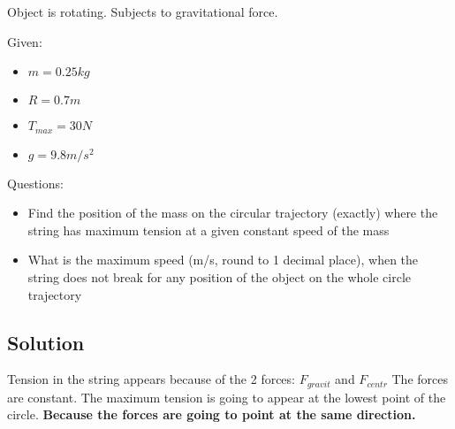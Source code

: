 
Object is rotating. Subjects to gravitational force.


\bigbreak Given: 
\begin{itemize}
    \item $  m  = 0.25kg $
    \item $ R = 0.7m $
    \item $ T_{max} = 30N $
    \item $ g = 9.8m/s^2 $
\end{itemize}


\bigbreak Questions:
\begin{itemize}
    \item Find the position of the mass on the circular trajectory (exactly) where the string has
    maximum tension at a given constant speed of the mass
    \item What is the maximum speed (m/s, round to 1 decimal place), when the string does not
    break for any position of the object on the whole circle trajectory
\end{itemize}

\subsection*{Solution}
Tension in the string appears because of the 2 forces: $F_{gravit}$ and $F_{centr}$
The forces are constant. The maximum tension is going to appear at the {lowest point} of the circle.
\textbf{Because the forces are going to point at the same direction.}


